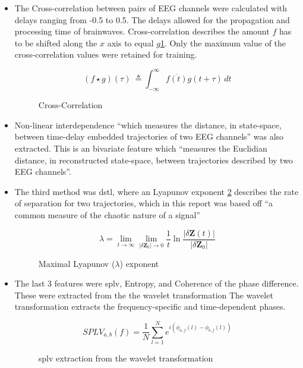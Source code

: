 \documentclass[12pt]{article}
\begin{document}
\begin{itemize}
\item The Cross-correlation between pairs of EEG channels were calculated with delays ranging from -0.5 to 0.5. The delays allowed for the propagation and processing time of brainwaves. Cross-correlation describes the amount $f$ has to be shifted along the $x$ axis to equal $g$\ref{eq:crossCorrelation}. Only the maximum value of the cross-correlation values were retained for training.

\begin{figure}[H]
\[ (f \star g)(\tau)\ \triangleq \int_{-\infty}^{\infty} \overline{f(t)} g(t+\tau)\,dt \]
\caption{Cross-Correlation}
\label{eq:crossCorrelation}
\end{figure}

\item Non-linear interdependence ``which measures the distance, in state-space, between time-delay embedded trajectories of two EEG channels'' was also extracted. This is an bivariate feature which ``measures the Euclidian distance, in reconstructed state-space, between trajectories described by two EEG channels''.

\item The third method was \acrfull{dstl}, where an Lyapunov exponent \ref{eq:lyapunov} describes the rate of separation for two trajectories, which in this report was based off  ``a common measure of the chaotic nature of a signal'' \cite{mirowski2009classification}

\begin{figure}[H]
\[ \lambda = \lim_{t \to \infty} \lim_{|\delta \mathbf{Z}_0| \to 0} \frac{1}{t} \ln\frac{| \delta\mathbf{Z}(t)|}{|\delta \mathbf{Z}_0|} \]
\caption{Maximal Lyapunov ($\lambda$) exponent}
\label{eq:lyapunov}
\end{figure}

\item The last 3 features were \acrfull{splv}, Entropy, and Coherence of the phase difference. These were extracted from the the wavelet transformation  The wavelet transformation extracts the frequency-specific and time-dependent phases. 

\begin{figure}[H]
\[ SPLV_{a,b}(f) = \frac{1}{N} \sum_{l=1}^{N} e^{i\left(\phi_{a,f}(l) - \phi_{b,f}(l)\right)} \]
\caption{\acrfull{splv} extraction from the wavelet transformation}
\label{eq:splv}
\end{figure}

\end{itemize}
\end{document}
